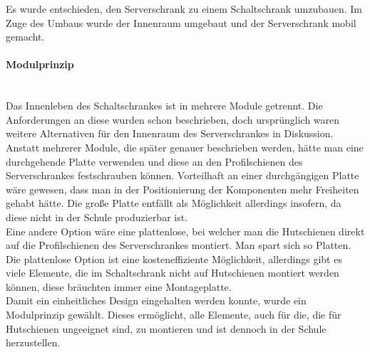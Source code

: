     Es wurde entschieden, den Serverschrank zu einem Schaltschrank umzubauen. Im Zuge des Umbaus wurde der Innenraum umgebaut und der Serverschrank mobil gemacht. 
    \paragraph{Modulprinzip}\mbox{}\\
    Das Innenleben des Schaltschrankes ist in mehrere Module getrennt. Die Anforderungen an diese wurden schon beschrieben, doch ursprünglich waren weitere Alternativen für den Innenraum des Serverschrankes in Diskussion.\\
    Anstatt mehrerer Module, die später genauer beschrieben werden, hätte man eine durchgehende Platte verwenden und diese an den Profilschienen des Serverschrankes festschrauben können. Vorteilhaft an einer durchgängigen Platte wäre gewesen, dass man in der Positionierung der Komponenten mehr Freiheiten gehabt hätte. Die große Platte entfällt als Möglichkeit allerdings insofern, da diese nicht in der Schule produzierbar ist.\\
    Eine andere Option wäre eine plattenlose, bei welcher man die Hutschienen direkt auf die Profilschienen des Serverschrankes montiert. Man spart sich so Platten. Die plattenlose Option ist eine kosteneffiziente Möglichkeit, allerdings gibt es viele Elemente, die im Schaltschrank nicht auf Hutschienen montiert werden können, diese bräuchten immer eine Montageplatte.\\
    Damit ein einheitliches Design eingehalten werden konnte, wurde ein Modulprinzip gewählt. Dieses ermöglicht, alle Elemente, auch für die, die für Hutschienen ungeeignet sind, zu montieren und ist dennoch in der Schule herzustellen.

